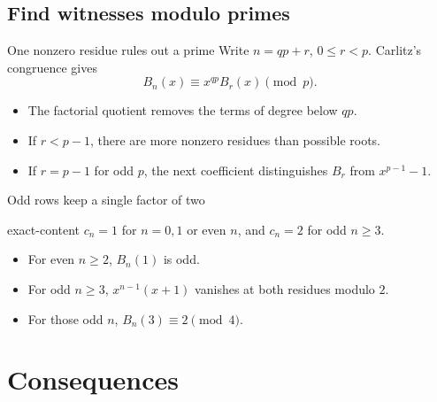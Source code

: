 \documentclass{beamer}
\begin{document}
\subsection{Find witnesses modulo primes}
\begin{frame}{One nonzero residue rules out a prime}
  Write $n=qp+r$, $0\le r<p$. Carlitz's congruence gives
  \[B_n(x)\equiv x^{qp}B_r(x)\pmod p.\]
  \begin{itemize}
    \item The factorial quotient removes the terms of degree below $qp$.
    \item If $r<p-1$, there are more nonzero residues than possible roots.
    \item If $r=p-1$ for odd $p$, the next coefficient distinguishes $B_r$ from $x^{p-1}-1$.
  \end{itemize}
\end{frame}

\begin{frame}{Odd rows keep a single factor of two}
  \begin{bookresult}{exact-content}
    $c_n=1$ for $n=0,1$ or even $n$, and $c_n=2$ for odd $n\ge3$.
  \end{bookresult}
  \begin{itemize}
    \item For even $n\ge2$, $B_n(1)$ is odd.
    \item For odd $n\ge3$, $x^{n-1}(x+1)$ vanishes at both residues modulo $2$.
    \item For those odd $n$, $B_n(3)\equiv2\pmod4$.
  \end{itemize}
\end{frame}

\section{Consequences}
\end{document}
